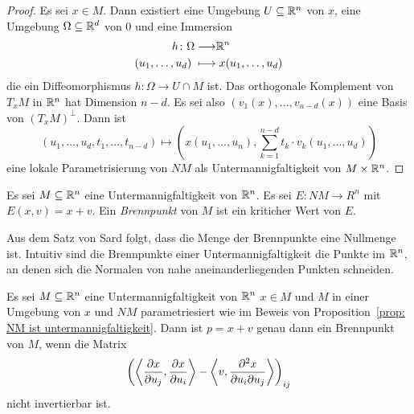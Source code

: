 \begin{proof}
    Es sei $x \in M$. Dann existiert eine Umgebung $U \subseteq { \mathbb R }^n$ von $x$, eine Umgebung 
    $\Omega \subseteq { \mathbb R }^d$ von $0$ und eine Immersion 
    \begin{align*}
        h \colon \Omega \longrightarrow & { \mathbb R }^n \\
        (u_1, \dots, u_d) \; \longmapsto & \; x(u_1, \dots, u_d)
    \end{align*}
    die ein Diffeomorphismus $h \colon \Omega \to U \cap M$ ist. Das orthogonale Komplement 
    von $T_xM$ in ${ \mathbb R }^n$ hat Dimension $n - d$. Es sei also 
    $(v_1(x), ..., v_{n-d}(x))$ eine Basis von $(T_xM)^{\perp}$. Dann ist 
    \[ (u_1, ..., u_d, t_1, ..., t_{n - d}) \longmapsto 
        \left(x(u_1, ..., u_n), \sum_{k = 1}^{n - d} t_k \cdot v_k(u_1, ..., u_d)\right) \]
    eine lokale Parametrisierung von $NM$ als Untermannigfaltigkeit von $M \times { \mathbb R }^n$.
\end{proof}

\begin{definition}[Brennpunkt]
    \label{def: brennpunkt}
    Es sei $M \subseteq { \mathbb R }^n$ eine Untermannigfaltigkeit von ${ \mathbb R }^n$. Es sei $E \colon NM \to R^n$ 
    mit $E (x, v) = x + v$. Ein \textit{Brennpunkt} von $M$ ist ein kriticher Wert von $E$.
\end{definition}

\begin{remark}
    Aus dem Satz von Sard folgt, dass die Menge der Brennpunkte eine Nullmenge ist.
    Intuitiv sind die Brennpunkte einer Untermannigfaltigkeit die Punkte im ${ \mathbb R }^n$, an denen sich
    die Normalen von nahe aneinanderliegenden Punkten schneiden.
\end{remark}

\begin{lemma}
    \label{lemma: char. von Brennpunkten}
    Es sei $M \subseteq { \mathbb R }^n$ eine Untermannigfaltigkeit von ${ \mathbb R }^n$ $x \in M$ und $M$ in einer 
    Umgebung von $x$ und $NM$ parametriesiert wie im Beweis von 
    Proposition~\ref{prop: NM ist untermannigfaltigkeit}. Dann ist $p = x + v$ genau dann ein
    Brennpunkt von $M$, wenn die Matrix 
    \[
        \left( \left\langle \pderive[x]{u_j}, \pderive[x]{u_i} \right\rangle - 
        \left\langle v , \pdderive[x]{u_i}{u_j} \right\rangle \right)_{ij}
    \]
    nicht invertierbar ist.
\end{lemma}

